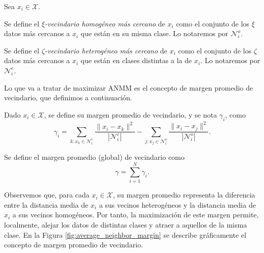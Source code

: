 \begin{definition}
    Sea $x_i \in \mathcal{X}$.
    
    Se define el \emph{$\xi$-vecindario homogéneo más cercano} de $x_i$ como el conjunto de los $\xi$ datos más cercanos a $x_i$ que están en su misma clase. Lo notaremos por $\mathcal{N}_i^o$.
    
    Se define el \emph{$\zeta$-vecindario heterogéneo más cercano} de $x_i$ como el conjunto de los $\zeta$ datos más cercanos a $x_i$ que están en clases distintas a la de $x_i$. Lo notaremos por $\mathcal{N}_i^e$.
\end{definition} 

Lo que va a tratar de maximizar ANMM es el concepto de margen promedio de vecindario, que definimos a continuación.

\begin{definition}
    Dado $x_i \in \mathcal{X}$, se define su margen promedio de vecindario, y se nota $\gamma_i$, como
    \begin{equation}
        \gamma_i = \sum\limits_{k \colon x_k \in \mathcal{N}_i^e} \frac{\|x_i - x_k \|^2}{|\mathcal{N}_i^e|} - \sum\limits_{j \colon x_j \in \mathcal{N}_i^o} \frac{\|x_i - x_j \|^2}{|\mathcal{N}_i^o|}.
    \end{equation}
    
    Se define el margen promedio (global) de vecindario como
    \begin{equation}
        \gamma = \sum_{i=1}^N \gamma_i.
    \end{equation}

    
\end{definition}

Observemos que, para cada $x_i \in \mathcal{X}$, su margen promedio representa la diferencia entre la distancia media de $x_i$ a sus vecinos heterogéneos y la distancia media de $x_i$ a sus vecinos homogéneos. Por tanto, la maximización de este margen permite, localmente, alejar los datos de distintas clases y atraer a aquellos de la misma clase. En la Figura \ref{fig:average_neighbor_margin} se describe gráficamente el concepto de margen promedio de vecindario.

